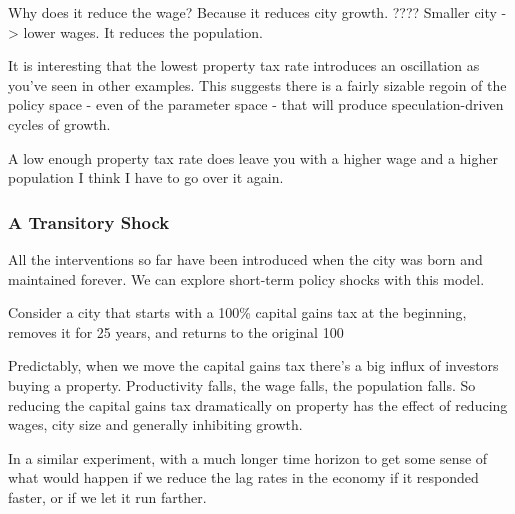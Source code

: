 \documentclass[]{article}
\begin{document}
Why does it reduce the wage? Because it reduces city growth. ???? Smaller city -> lower wages. It reduces the population.

It is interesting that the lowest property tax rate introduces an oscillation as you’ve seen in other examples. This suggests there is a fairly sizable regoin of the policy space - even of the parameter space - that will produce speculation-driven cycles of growth.

A low enough property tax rate does leave you with a higher wage and a higher population
I think I have to go over it again.

\subsubsection{A Transitory Shock}

All the interventions so far have been introduced when the city was born and maintained forever. We can explore short-term policy shocks with this model.

Consider a city that starts with a 100\% capital gains tax at the beginning, removes it for 25 years, and returns to the original 100%

Predictably, when we move the capital gains tax there’s a big influx of investors buying a property. Productivity falls, the wage falls, the population falls. So reducing the capital gains tax dramatically on property has the effect of reducing wages, city size and generally inhibiting growth.

In a similar experiment, with a much longer time horizon to get some sense of what would happen if we reduce the lag rates in the economy if it responded faster, or if we let it run farther.
\end{document}
